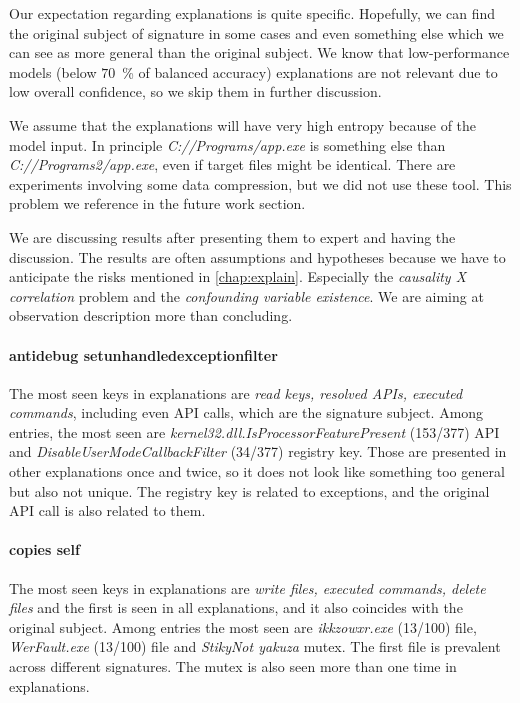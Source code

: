 Our expectation regarding explanations is quite specific. Hopefully, we can find the original subject of signature in some cases and even something else which we can see as more general than the original subject. We know that low-performance models (below $70$~\% of balanced accuracy) explanations are not relevant due to low overall confidence, so we skip them in further discussion.

We assume that the explanations will have very high entropy because of the model input. In principle \emph{C://Programs/app.exe} is something else than \emph{C://Programs2/app.exe}, even if target files might be identical. There are experiments involving some data compression, but we did not use these tool. This problem we reference in the future work section. 

We are discussing results after presenting them to expert and having the discussion. The results are often assumptions and hypotheses because we have to anticipate the risks mentioned in \ref{chap:explain}. Especially the \emph{causality X correlation} problem and the \emph{confounding variable existence}. We are aiming at observation description more than concluding.

\paragraph{antidebug setunhandledexceptionfilter}
The most seen keys in explanations are \emph{read keys, resolved APIs, executed commands}, including even API calls, which are the signature subject. Among entries, the most seen are \emph{kernel32.dll.IsProcessorFeaturePresent} (153/377) API and \emph{DisableUserModeCallbackFilter} (34/377) registry key. Those are presented in other explanations once and twice, so it does not look like something too general but also not unique. The registry key is related to exceptions, and the original API call is also related to them.

\paragraph{copies self}
The most seen keys in explanations are \emph{write files, executed commands, delete files} and the first is seen in all explanations, and it also coincides with the original subject. Among entries the most seen are \emph{ikkzowxr.exe} (13/100) file, \emph{WerFault.exe} (13/100) file and \emph{StikyNot yakuza} mutex. The first file is prevalent across different signatures. The mutex is also seen more than one time in explanations.

